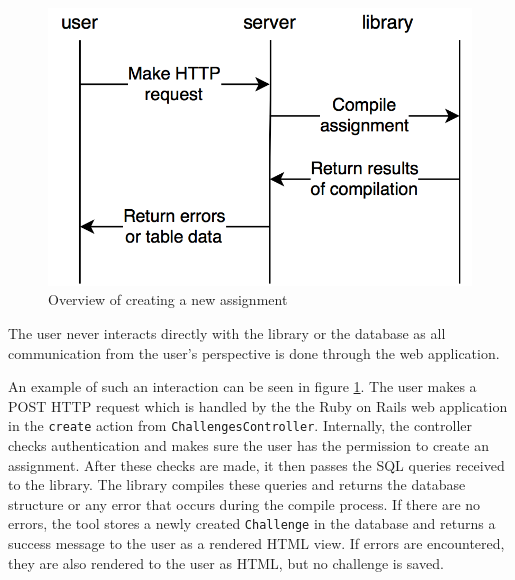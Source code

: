 \begin{figure}[H]
    \centering
    \includegraphics[width=(\linewidth / 2)]{Chapters/4-Design/create_assignment.png}
    \caption{Overview of creating a new assignment}
    \label{fig:create_assignment}
\end{figure}

The user never interacts directly with the library or the database as all communication from the user's perspective is done through the web application.

An example of such an interaction can be seen in figure \ref{fig:create_assignment}. The user makes a POST HTTP request which is handled by the the Ruby on Rails web application in the \texttt{create} action from \texttt{ChallengesController}. Internally, the controller checks authentication and makes sure the user has the permission to create an assignment. After these checks are made, it then passes the SQL queries received to the library. The library compiles these queries and returns the database structure or any error that occurs during the compile process. If there are no errors, the tool stores a newly created \texttt{Challenge} in the database and returns a success message to the user as a rendered HTML view. If errors are encountered, they are also rendered to the user as HTML, but no challenge is saved.